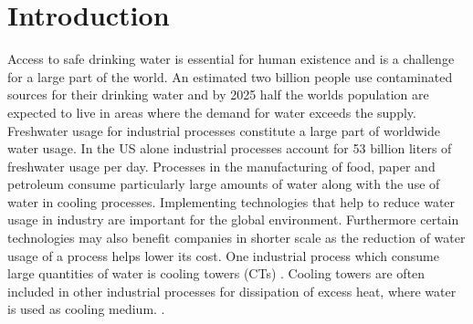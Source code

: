 \chapter{Introduction}





Access to safe drinking water is essential for human existence and is a challenge for a large part of the world.
An estimated two billion people use contaminated sources for their drinking water and by 2025 half the worlds population are expected to live in areas where the demand for water exceeds the supply. %
Freshwater usage for industrial processes constitute a large part of worldwide water usage.
In the US alone industrial processes account for 53 billion liters of freshwater usage per day. %
Processes in the manufacturing of food, paper and petroleum consume particularly large amounts of water along with the use of water in cooling processes. %
Implementing technologies that help to reduce water usage in industry are important for the global environment. %
Furthermore certain technologies may also benefit companies in shorter scale as the reduction of water usage of a process helps lower its cost. %
One industrial process which consume large quantities of water is cooling towers (CTs) \citep{farahanniRecoveryCoolingTower_2016}. 
Cooling towers are often included in other industrial processes for dissipation of excess heat, where water is used as cooling medium. \citep{PlantEngineerBookReference2001}. 

